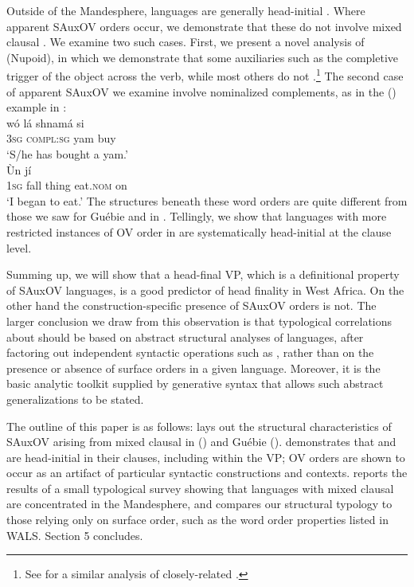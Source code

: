 \documentclass[output=paper]{LSP/langsci}
\begin{document}
Outside of the Mandesphere, languages are generally head-initial \citep{heine76}. Where apparent SAuxOV orders occur, we demonstrate that these do not involve mixed clausal  \citep{manfredi97,kandy03, aboh09}. We examine two such cases. First, we present a novel analysis of  (Nupoid), in which we demonstrate that some auxiliaries such as the completive trigger  of the object across the verb, while most others do not .\footnote{See \citet{kandy03} for a similar analysis of closely-related .} The second case of apparent SAuxOV we examine involve nominalized complements, as in the  () example in :
\ea \label{ex:2:fakesauxov}
\ea {} \label{ex:2a:gwari}\\
\gll w\'o l\'a shnam\'a si \\
3\textsc{sg} \textsc{compl:sg} yam buy \\
\glt `S/he has bought a yam.'
\ex {} \label{ex:2b:gwari} \\	
\gll \`Un    j\'i  \\
1\textsc{sg} fall thing eat.\textsc{nom} on  \\
\glt `I began to eat.'
\z
\z
The structures beneath these word orders are quite different from those we saw for Gu\'ebie and  in . Tellingly, we show that languages with more restricted instances of OV order in  are systematically head-initial at the clause level. 

Summing up, we will show that a head-final VP, which is a definitional property of SAuxOV languages, is a good predictor of head finality in West Africa. On the other hand the construction-specific presence of SAuxOV orders is not. The larger conclusion we draw from this observation is that typological correlations about  should be based on abstract structural analyses of languages, after factoring out independent syntactic operations such as , rather than on the presence or absence of surface orders in a given language. Moreover, it is the basic analytic toolkit supplied by generative syntax that allows such abstract generalizations to be stated.
 
 The outline of this paper is as follows:  lays out the structural characteristics of SAuxOV arising from mixed clausal  in  () and Gu\'ebie ().  demonstrates that  and  are head-initial in their clauses, including within the VP; OV orders are shown to occur as an artifact of particular syntactic constructions and contexts.  reports the results of a small typological survey showing that languages with mixed clausal  are concentrated in the Mandesphere, and compares our structural typology to those relying only on surface order, such as the word order properties listed in WALS. Section 5 concludes. 
\end{document}
